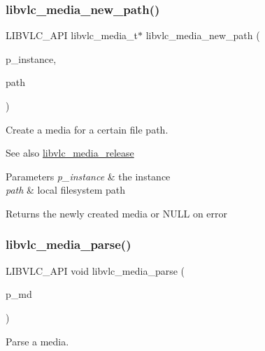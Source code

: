 \subsubsection{\texorpdfstring{libvlc\+\_\+media\+\_\+new\+\_\+path()}{libvlc\_media\_new\_path()}}
{\footnotesize\ttfamily L\+I\+B\+V\+L\+C\+\_\+\+A\+PI libvlc\+\_\+media\+\_\+t$\ast$ libvlc\+\_\+media\+\_\+new\+\_\+path (\begin{DoxyParamCaption}\item[{\hyperlink{group__libvlc__core_ga316d739a80da4678206c79f4d6c2e284}{libvlc\+\_\+instance\+\_\+t} $\ast$}]{p\+\_\+instance,  }\item[{const char $\ast$}]{path }\end{DoxyParamCaption})}

Create a media for a certain file path.

\begin{DoxySeeAlso}{See also}
\hyperlink{group__libvlc__media_gaffccede262624a361e20c3e887fa9b42}{libvlc\+\_\+media\+\_\+release}
\end{DoxySeeAlso}

\begin{DoxyParams}{Parameters}
{\em p\+\_\+instance} & the instance \\
\hline
{\em path} & local filesystem path \\
\hline
\end{DoxyParams}
\begin{DoxyReturn}{Returns}
the newly created media or N\+U\+LL on error 
\end{DoxyReturn}
\mbox{\label{group__libvlc__media_gad9e48150dcb1a066c51688f6e4a216f1}} 
\subsubsection{\texorpdfstring{libvlc\+\_\+media\+\_\+parse()}{libvlc\_media\_parse()}}
{\footnotesize\ttfamily L\+I\+B\+V\+L\+C\+\_\+\+A\+PI void libvlc\+\_\+media\+\_\+parse (\begin{DoxyParamCaption}\item[{libvlc\+\_\+media\+\_\+t $\ast$}]{p\+\_\+md }\end{DoxyParamCaption})}

Parse a media.

